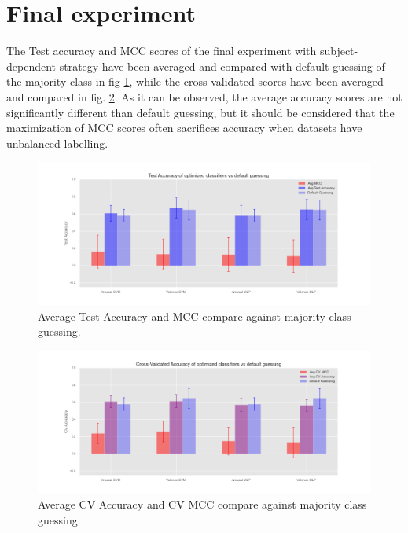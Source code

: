 \section{Final experiment}
\label{sec:appendix_A4}
The Test accuracy and \ac{MCC} scores of the final experiment with subject-dependent strategy have been averaged and compared with default guessing of the majority class in fig \ref{fig:experiment_test_recap}, while the cross-validated scores have been averaged and compared in fig. \ref{fig:experiment_cv_recap}. As it can be observed, the average accuracy scores are not significantly different than default guessing, but it should be considered that the maximization of \ac{MCC} scores often sacrifices accuracy when datasets have unbalanced labelling.


\begin{figure}[!htb]
\includegraphics[width=16cm]{img/appendix/final_experiment/experiment_test_recap.png}
\centering
\caption{Average Test Accuracy and MCC compare against majority class guessing.}\label{fig:experiment_test_recap}
\end{figure}

\begin{figure}[!htb]
\includegraphics[width=16cm]{img/appendix/final_experiment/experiment_cv_recap.png}
\centering
\caption{Average CV Accuracy and CV MCC compare against majority class guessing.}\label{fig:experiment_cv_recap}
\end{figure}
\FloatBarrier


